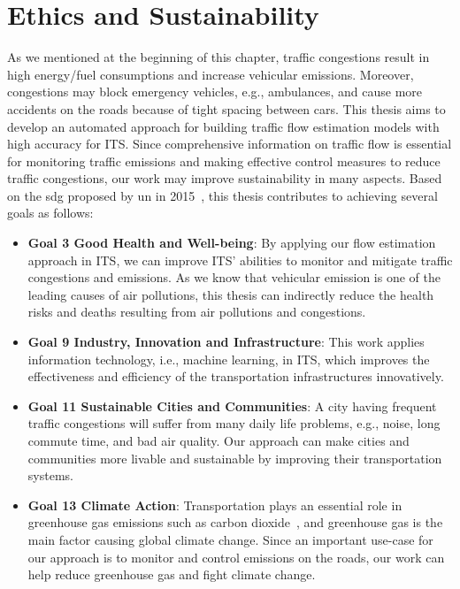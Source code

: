 \documentclass[english]{kththesis}
\begin{document}
\section{Ethics and Sustainability}
\label{sec:ehicsAndSustainability}

As we mentioned at the beginning of this chapter, traffic congestions result in high energy/fuel consumptions and increase vehicular emissions. Moreover, congestions may block emergency vehicles, e.g., ambulances, and cause more accidents on the roads because of tight spacing between cars. This thesis aims to develop an automated approach for building traffic flow estimation models with high accuracy for ITS. Since comprehensive information on traffic flow is essential for monitoring traffic emissions and making effective control measures to reduce traffic congestions, our work may improve sustainability in many aspects. Based on the \gls{sdg} proposed by \gls{un} in 2015~\cite{united_nations_sdg}, this thesis contributes to achieving several goals as follows:

\begin{itemize}
    \item \textbf{Goal 3 Good Health and Well-being}: By applying our flow estimation approach in ITS, we can improve ITS' abilities to monitor and mitigate traffic congestions and emissions. As we know that vehicular emission is one of the leading causes of air pollutions, this thesis can indirectly reduce the health risks and deaths resulting from air pollutions and congestions.
    \item \textbf{Goal 9 Industry, Innovation and Infrastructure}: This work applies information technology, i.e., machine learning, in ITS, which improves the effectiveness and efficiency of the transportation infrastructures innovatively.
    \item \textbf{Goal 11 Sustainable Cities and Communities}: A city having frequent traffic congestions will suffer from many daily life problems, e.g., noise, long commute time, and bad air quality. Our approach can make cities and communities more livable and sustainable by improving their transportation systems.
    \item \textbf{Goal 13 Climate Action}: Transportation plays an essential role in greenhouse gas emissions such as carbon dioxide~\cite{barth_co2}, and greenhouse gas is the main factor causing global climate change. Since an important use-case for our approach is to monitor and control emissions on the roads, our work can help reduce greenhouse gas and fight climate change.
    
\end{itemize}
\end{document}
